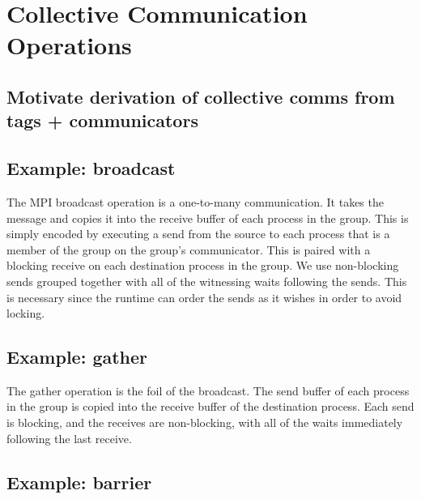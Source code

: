 \section{Collective Communication Operations}

\subsection{Motivate derivation of collective comms from tags + communicators}

\subsection{Example: broadcast}
The MPI broadcast operation is a one-to-many communication. It takes the message
and copies it into the receive buffer of each process in the group. This is
simply encoded by executing a send from the source to each process that is a
member of the group on the group's communicator. This is paired with a blocking
receive on each destination process in the group. We use non-blocking sends
grouped together with all of the witnessing waits following the sends. This is
necessary since the runtime can order the sends as it wishes in order to avoid
locking.

\subsection{Example: gather}
The gather operation is the foil of the broadcast. The send buffer of each
process in the group is copied into the receive buffer of the destination
process. Each send is blocking, and the receives are non-blocking, with all of
the waits immediately following the last receive.

\subsection{Example: barrier}

